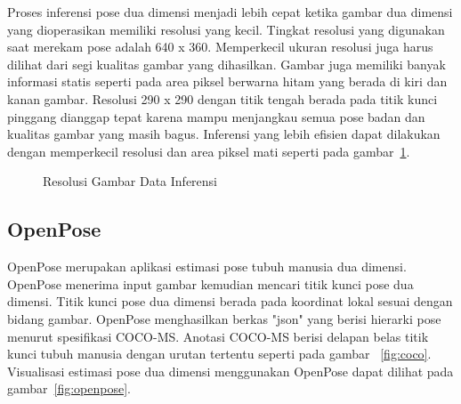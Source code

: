 Proses inferensi pose dua dimensi menjadi lebih cepat ketika gambar dua dimensi yang dioperasikan
memiliki resolusi yang kecil. Tingkat resolusi yang digunakan saat merekam pose adalah 640 x 360.
Memperkecil ukuran resolusi juga harus dilihat dari segi kualitas gambar yang dihasilkan.
Gambar juga memiliki banyak informasi statis seperti pada area piksel berwarna hitam yang berada
di kiri dan kanan gambar. Resolusi 290 x 290 dengan titik tengah berada pada titik kunci pinggang dianggap tepat
karena mampu menjangkau semua pose badan dan kualitas gambar yang masih bagus.
Inferensi yang lebih efisien dapat dilakukan dengan memperkecil resolusi
dan area piksel mati seperti pada gambar~\ref{fig:prainferensi}.

\begin{figure}[htbp]
    \begin{center}
    \end{center}
    \vspace{-20pt}
    \captionsetup{labelfont=bf, textfont=bf}
    \caption{Resolusi Gambar Data Inferensi}
    \vspace{-10pt}
    \captionsetup{labelfont=md, textfont=md}
    \label{fig:prainferensi}
\end{figure}

\subsection{OpenPose}

OpenPose merupakan aplikasi estimasi pose tubuh manusia dua dimensi. OpenPose menerima input gambar
kemudian mencari titik kunci pose dua dimensi. Titik kunci pose dua dimensi berada pada koordinat
lokal sesuai dengan bidang gambar. OpenPose menghasilkan berkas "json" yang berisi hierarki pose
menurut spesifikasi COCO-MS. Anotasi COCO-MS berisi delapan belas titik kunci tubuh manusia dengan
urutan tertentu seperti
pada gambar ~\ref{fig:coco}. Visualisasi estimasi pose dua dimensi menggunakan OpenPose dapat dilihat
pada gambar~\ref{fig:openpose}.

